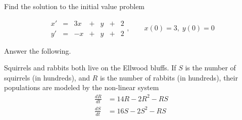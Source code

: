 \documentclass[addpoints,12pt]{exam}
\begin{document}
\newpage
\begin{questions}
 
 \question[10] Find the solution to the initial value problem
 
 $$\begin{array}{ccccccc}
  x' & = & 3x & + & y&+&2 \\
  y' & = & -x & + & y&+&2
 \end{array},\qquad x(0)=3,\;y(0)=0$$
 
 \newpage
 
  \question[18] Answer the following.
 
 \newpage
 
 \question[12] Squirrels and rabbits both live on the Ellwood bluffs. If $S$ is the number of squirrels (in hundreds), and $R$ is the number of rabbits (in hundreds), their populations are modeled by the non-linear system
 \begin{align*}
  \frac{dR}{dt}&=14R-2R^2-RS\\
  \frac{dS}{dt}&=16S-2S^2-RS
 \end{align*}
\end{questions}
\end{document}
